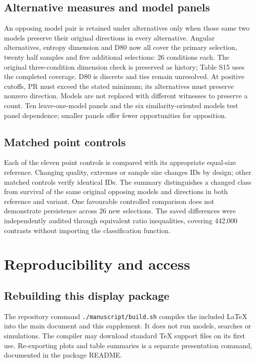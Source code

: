 \documentclass[12pt]{article}
\begin{document}
\subsection{Alternative measures and model panels}
An opposing model pair is retained under alternatives only when those same two models preserve their original directions in every alternative. Angular alternatives, entropy dimension and D80 now all cover the primary selection, twenty half samples and five additional selections: 26 conditions each. The original three-condition dimension check is preserved as history; Table S15 uses the completed coverage. D80 is discrete and ties remain unresolved. At positive cutoffs, PR must exceed the stated minimum; its alternatives must preserve nonzero direction. Models are not replaced with different witnesses to preserve a count. Ten leave-one-model panels and the six similarity-oriented models test panel dependence; smaller panels offer fewer opportunities for opposition.

\FloatBarrier
\subsection{Matched point controls}
Each of the eleven point controls is compared with its appropriate equal-size reference. Changing quality, extremes or sample size changes IDs by design; other matched controls verify identical IDs. The summary distinguishes a changed class from survival of the same original opposing models and directions in both reference and variant. One favourable controlled comparison does not demonstrate persistence across 26 new selections. The saved differences were independently audited through equivalent ratio inequalities, covering 442,000 contrasts without importing the classification function.

\FloatBarrier

\section{Reproducibility and access}

\subsection{Rebuilding this display package}
The repository command \nolinkurl{./manuscript/build.sh} compiles the included LaTeX into the main document and this supplement. It does not run models, searches or simulations. The compiler may download standard TeX support files on its first use. Re-exporting plots and table summaries is a separate presentation command, documented in the package README.
\end{document}
